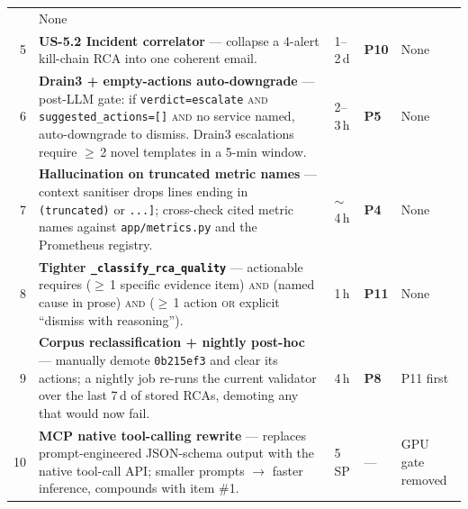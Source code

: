\documentclass[11pt,a4paper,oneside]{report}
\begin{document}
\begin{longtable}{rp{} p{} p{} p{}}
                                              & None \\
5 & \textbf{US-5.2 Incident correlator} --- collapse a 4-alert
    kill-chain RCA into one coherent email.
                                              & 1--2\,d
                                              & \textbf{P10}
                                              & None \\
6 & \textbf{Drain3 + empty-actions auto-downgrade} --- post-LLM
    gate: if \texttt{verdict=escalate} \textsc{and}
    \texttt{suggested\_actions=[]} \textsc{and} no service named,
    auto-downgrade to dismiss.  Drain3 escalations require
    $\ge$\,2 novel templates in a 5-min window.
                                              & 2--3\,h
                                              & \textbf{P5}
                                              & None \\
7 & \textbf{Hallucination on truncated metric names} --- context
    sanitiser drops lines ending in \texttt{(truncated)} or
    \texttt{...]}; cross-check cited metric names against
    \texttt{app/metrics.py} and the Prometheus registry.
                                              & $\sim$4\,h
                                              & \textbf{P4}
                                              & None \\
8 & \textbf{Tighter \texttt{\_classify\_rca\_quality}} ---
    actionable requires ($\ge$\,1 specific evidence item)
    \textsc{and} (named cause in prose) \textsc{and} ($\ge$\,1
    action \textsc{or} explicit ``dismiss with reasoning'').
                                              & 1\,h
                                              & \textbf{P11}
                                              & None \\
9 & \textbf{Corpus reclassification + nightly post-hoc} ---
    manually demote \texttt{0b215ef3} and clear its actions; a
    nightly job re-runs the current validator over the last 7\,d of
    stored RCAs, demoting any that would now fail.
                                              & 4\,h
                                              & \textbf{P8}
                                              & P11 first \\
10 & \textbf{MCP native tool-calling rewrite} --- replaces
     prompt-engineered JSON-schema output with the native tool-call
     API; smaller prompts $\to$ faster inference, compounds with
     item \#1.
                                              & 5\,SP
                                              & ---
                                              & GPU gate removed \\

\end{longtable}
\end{document}
